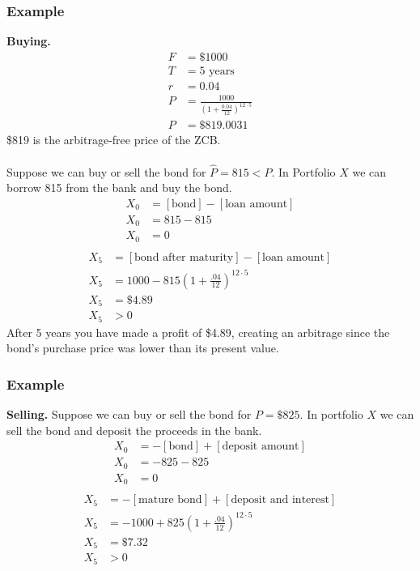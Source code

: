 \documentclass[12pt,letterpaper, twocolumn]{article}
\begin{document}
\subsubsection*{Example}
\textbf{Buying.} 
\begin{align*}
    F &= \$1000\\
    T&= 5\text{ years}\\
    r&= 0.04\\
    P&= \frac{1000}{(1+\frac{0.04}{12})^{12\cdot 5}}\\
    P&= \$819.0031
\end{align*}
\$819 is the arbitrage-free price of the ZCB.
\\\\
Suppose we can buy or sell the bond for $\hat{P}=815<P$. In Portfolio $X$ we can borrow 815 from the bank and buy the bond. 
\begin{align*}
    X_0 &= [\text{bond}] - [\text{loan amount}]\\
    X_0 &= 815-815\\
    X_0 &= 0\\
\end{align*}
\begin{align*}
    X_5 &= [\text{bond after maturity}] - [\text{loan amount}]\\
    X_5 &= 1000-815(1+\frac{.04}{12})^{12\cdot5}\\
    X_5 &= \$4.89\\
    X_5 &> 0
\end{align*}
After 5 years you have made a profit of \$4.89, creating an arbitrage since the bond's purchase price was lower than its present value. 

\subsubsection*{Example}
\textbf{Selling.} 
Suppose we can buy or sell the bond for $P=\$825$. In portfolio $X$ we can sell the bond and deposit the proceeds in the bank. 
\begin{align*}
    X_0 &= -[\text{bond}] + [\text{deposit amount}]\\
    X_0 &= -825-825\\
    X_0 &= 0\\
\end{align*}
\begin{align*}
    X_5 &= -[\text{mature bond}] + [\text{deposit and interest}]\\
    X_5 &= -1000+825(1+\frac{.04}{12})^{12\cdot5}\\
    X_5 &= \$7.32\\
    X_5 &> 0
\end{align*}
\end{document}
